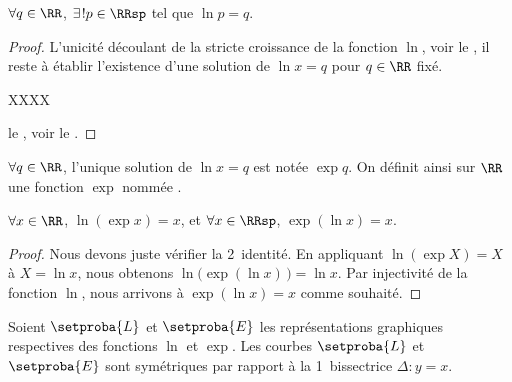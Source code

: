 \begin{fact}
	$\forall q \in \RR$,
	$\exists\kern1pt! p \in \RRsp$ tel que 
	$\ln p = q$.
\end{fact}


\begin{proof}
	L'unicité découlant de la stricte croissance de la fonction $\ln$, voir le , il reste à établir l'existence d'une solution de $\ln x = q$ pour $q \in \RR$ fixé.
	
	
	
	XXXX
	
	le \tvi, voir le .
	
\end{proof}




\begin{defi}
	$\forall q \in \RR$, 
	l'unique solution de $\ln x = q$ est notée $\exp q$.
	On définit ainsi sur $\RR$ une fonction $\exp$ nommée .
\end{defi}




\begin{fact}
	$\forall x \in \RR$, $\ln ( \exp x ) = x$,
	et
	$\forall x \in \RRsp$, $\exp ( \ln x ) = x$.
\end{fact}


\begin{proof}	
	Nous devons juste vérifier la 2\ieme\ identité.
	En appliquant $\ln ( \exp X ) = X$ à $X = \ln x$,
	nous obtenons $\ln \big( \exp ( \ln x ) \,\big) = \ln x$.
	Par injectivité de la fonction $\ln$, nous arrivons à $\exp ( \ln x ) = x$ comme souhaité.
\end{proof}




\begin{fact}
	Soient $\setproba{L}$ et $\setproba{E}$ les représentations graphiques respectives des fonctions $\ln$ et $\exp$.
	Les courbes $\setproba{L}$ et $\setproba{E}$ sont symétriques par rapport à la 1\iere\ bissectrice $\Delta: y = x$.
\end{fact}


